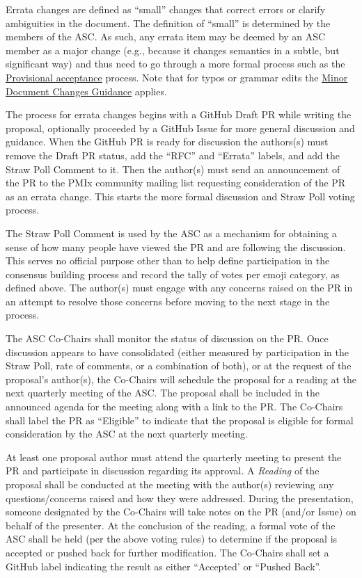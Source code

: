 \documentclass{article}
\begin{document}
Errata changes are defined as ``small'' changes that correct errors or clarify ambiguities in the document.
The definition of ``small'' is determined by the members of the ASC.
As such, any errata item may be deemed by an ASC member as a major change (e.g., because it changes semantics in a subtle, but significant way) and thus need to go through a more formal process such as the \hyperlink{provisional-acceptance}{Provisional acceptance} process.
Note that for typos or grammar edits the \hyperlink{administrative-changes-guidance}{Minor Document Changes Guidance} applies.

The process for errata changes begins with a GitHub Draft PR while writing the proposal, optionally proceeded by a GitHub Issue for more general discussion and guidance.
When the GitHub PR is ready for discussion the authors(s) must remove the Draft PR status, add the ``RFC'' and ``Errata'' labels, and add the Straw Poll Comment to it.
Then the author(s) must send an announcement of the PR to the PMIx community mailing list requesting consideration of the PR as an errata change.
This starts the more formal discussion and Straw Poll voting process.

The Straw Poll Comment is used by the ASC as a mechanism for
obtaining a sense of how many people have viewed the PR and are
following the discussion. This serves no official purpose other than to
help define participation in the consensus building process and record
the tally of votes per emoji category, as defined above.
The author(s) must engage with any concerns raised on the PR in an attempt to
resolve those concerns before moving to the next stage in the process.

The ASC Co-Chairs shall monitor the status of discussion on the PR. Once
discussion appears to have consolidated (either measured by
participation in the Straw Poll, rate of comments, or a combination of
both), or at the request of the proposal's author(s), the Co-Chairs will
schedule the proposal for a reading at the next quarterly meeting of the
ASC. The proposal shall be included in the announced agenda for the
meeting along with a link to the PR.
The Co-Chairs shall label the PR as ``Eligible'' to indicate that the proposal is
eligible for formal consideration by the ASC at the next quarterly meeting.

At least one proposal author must attend the quarterly meeting to
present the PR and participate in discussion regarding its approval. A
\textit{Reading} of the proposal shall be conducted at the meeting with the
author(s) reviewing any questions/concerns raised and how they were
addressed. During the presentation, someone designated by the Co-Chairs
will take notes on the PR (and/or Issue) on behalf of the presenter.
At the conclusion of the reading, a formal vote of the ASC shall be held
(per the above voting rules) to determine if the proposal is accepted or
pushed back for further modification.
The Co-Chairs shall set a GitHub label indicating the
result as either ``Accepted' or ``Pushed Back''.
\end{document}
